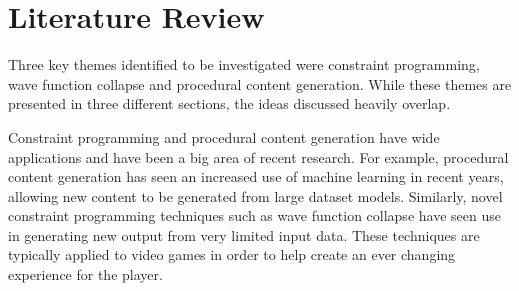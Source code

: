 \chapter{Literature Review}





Three key themes identified to be investigated were constraint programming, wave function collapse and procedural content generation. While these themes are presented in three different sections, the ideas discussed heavily overlap.

Constraint programming and procedural content generation have wide applications and have been a big area of recent research. For example, procedural content generation has seen an increased use of machine learning in recent years, allowing new content to be generated from large dataset models. Similarly, novel constraint programming techniques such as wave function collapse have seen use in generating new output from very limited input data. These techniques are typically applied to video games in order to help create an ever changing experience for the player.

